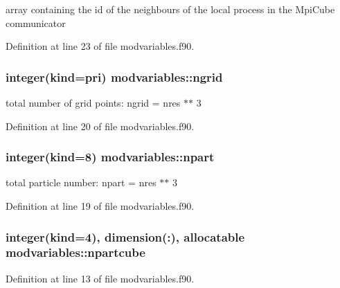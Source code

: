 array containing the id of the neighbours of the local process in the Mpi\+Cube communicator 



Definition at line 23 of file modvariables.\+f90.

\subsubsection[{\texorpdfstring{ngrid}{ngrid}}]{\setlength{\rightskip}{0pt plus 5cm}integer(kind={\bf pri}) modvariables\+::ngrid}\hypertarget{namespacemodvariables_afeecc1a4b626f4eb8e48767dbf41d0a2}{}\label{namespacemodvariables_afeecc1a4b626f4eb8e48767dbf41d0a2}


total number of grid points\+: ngrid = nres $\ast$$\ast$ 3 



Definition at line 20 of file modvariables.\+f90.

\subsubsection[{\texorpdfstring{npart}{npart}}]{\setlength{\rightskip}{0pt plus 5cm}integer(kind=8) modvariables\+::npart}\hypertarget{namespacemodvariables_a8c3df9e10fb71cff536986d2a33fa2c7}{}\label{namespacemodvariables_a8c3df9e10fb71cff536986d2a33fa2c7}


total particle number\+: npart = nres $\ast$$\ast$ 3 



Definition at line 19 of file modvariables.\+f90.

\subsubsection[{\texorpdfstring{npartcube}{npartcube}}]{\setlength{\rightskip}{0pt plus 5cm}integer(kind=4), dimension(\+:), allocatable modvariables\+::npartcube}\hypertarget{namespacemodvariables_a8cd49c574b692bbeae7029e8d138f58e}{}\label{namespacemodvariables_a8cd49c574b692bbeae7029e8d138f58e}


Definition at line 13 of file modvariables.\+f90.

